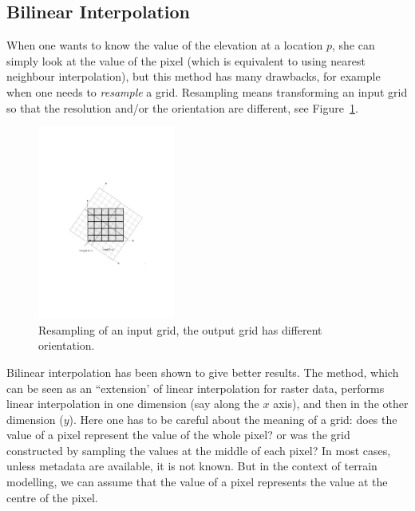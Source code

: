 \subsection{Bilinear Interpolation}

When one wants to know the value of the elevation at a location $p$, she can simply look at the value of the pixel (which is equivalent to using nearest neighbour interpolation), but this method has many drawbacks, for example when one needs to \emph{resample} a grid. 
Resampling means transforming an input grid so that the resolution and/or the orientation are different, see Figure~\ref{fig:resampling}.
\begin{figure}
  \centering
  \includegraphics[width=0.4\textwidth]{figs/resampling}
  \caption{Resampling of an input grid, the output grid has different orientation.} 
\label{fig:resampling}
\end{figure}

Bilinear interpolation has been shown to give better results. 
The method, which can be seen as an ``extension' of linear interpolation for raster data, performs linear interpolation in one dimension (say along the $x$ axis), and then in the other dimension ($y$). 
Here one has to be careful about the meaning of a grid: does the value of a pixel represent the value of the whole pixel? or was the grid constructed by sampling the values at the middle of each pixel? 
In most cases, unless metadata are available, it is not known. 
But in the context of terrain modelling, we can assume that the value of a pixel represents the value at the centre of the pixel.

